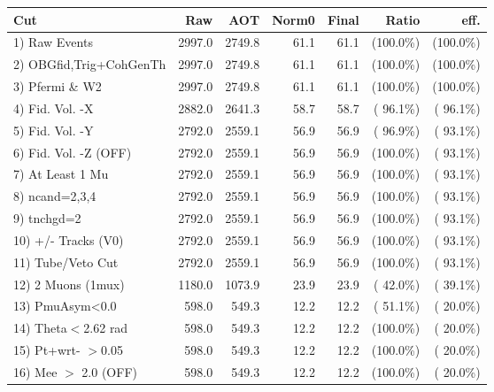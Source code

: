  \begin{table}[h!]\centering
 \begin{tabular}{||l||r|r|r|r|r|r||}
 \hline
 \hline
 Cut & Raw & AOT & Norm0 & Final & Ratio & eff.       \\
 \hline
  1) Raw Events           &       2997.0 &       2749.8 &         61.1 &         61.1 & (100.0\%) & (100.0\%) \\
  2) OBGfid,Trig+CohGenTh &       2997.0 &       2749.8 &         61.1 &         61.1 & (100.0\%) & (100.0\%) \\
  3) Pfermi \& W2         &       2997.0 &       2749.8 &         61.1 &         61.1 & (100.0\%) & (100.0\%) \\
  4) Fid. Vol. -X         &       2882.0 &       2641.3 &         58.7 &         58.7 & ( 96.1\%) & ( 96.1\%) \\
  5) Fid. Vol. -Y         &       2792.0 &       2559.1 &         56.9 &         56.9 & ( 96.9\%) & ( 93.1\%) \\
  6) Fid. Vol. -Z (OFF)   &       2792.0 &       2559.1 &         56.9 &         56.9 & (100.0\%) & ( 93.1\%) \\
  7) At Least 1 Mu        &       2792.0 &       2559.1 &         56.9 &         56.9 & (100.0\%) & ( 93.1\%) \\
  8) ncand=2,3,4          &       2792.0 &       2559.1 &         56.9 &         56.9 & (100.0\%) & ( 93.1\%) \\
  9) tnchgd=2             &       2792.0 &       2559.1 &         56.9 &         56.9 & (100.0\%) & ( 93.1\%) \\
 10) +/- Tracks (V0)      &       2792.0 &       2559.1 &         56.9 &         56.9 & (100.0\%) & ( 93.1\%) \\
 11) Tube/Veto Cut        &       2792.0 &       2559.1 &         56.9 &         56.9 & (100.0\%) & ( 93.1\%) \\
 12) 2 Muons (1mux)       &       1180.0 &       1073.9 &         23.9 &         23.9 & ( 42.0\%) & ( 39.1\%) \\
 13) PmuAsym<0.0          &        598.0 &        549.3 &         12.2 &         12.2 & ( 51.1\%) & ( 20.0\%) \\
 14) Theta$<$2.62 rad     &        598.0 &        549.3 &         12.2 &         12.2 & (100.0\%) & ( 20.0\%) \\
 15) Pt+wrt- $>$0.05      &        598.0 &        549.3 &         12.2 &         12.2 & (100.0\%) & ( 20.0\%) \\
 16) Mee $>$ 2.0  (OFF)   &        598.0 &        549.3 &         12.2 &         12.2 & (100.0\%) & ( 20.0\%) \\

\end{tabular}
\end{table}
